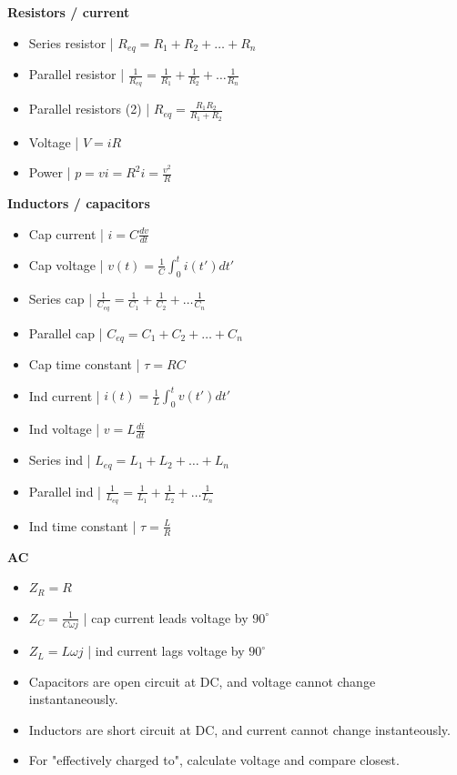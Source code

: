 \documentclass{article}
\begin{document}
\textbf{Resistors / current}
\begin{itemize}
    \item Series resistor | $R_{eq} = R_1 + R_2 + \dots + R_n$
    \item Parallel resistor | $\frac{1}{R_{eq}} = \frac{1}{R_1} + \frac{1}{R_2} + \dots \frac{1}{R_n}$
    \item Parallel resistors (2) | $R_{eq} = \frac{R_1R_2}{R_1 + R_2}$
    \item Voltage | $V = iR$
    \item Power | $p = vi = R^2i = \frac{v^2}{R}$
\end{itemize}
\textbf{Inductors / capacitors}
\begin{itemize}
    \item Cap current | $i = C \frac{dv}{dt}$ 
    \item Cap voltage | $v(t) = \frac{1}{C}\int_0^t i(t')dt'$
    \item Series cap | $\frac{1}{C_{eq}} = \frac{1}{C_1} + \frac{1}{C_2} + \dots \frac{1}{C_n}$
    \item Parallel cap | $C_{eq} = C_1 + C_2 + \dots + C_n$
    \item Cap time constant | $\tau = RC$
    \item Ind current | $i(t) = \frac{1}{L}\int_0^t v(t')dt'$
    \item Ind voltage | $v = L \frac{di}{dt}$
    \item Series ind | $L_{eq} = L_1 + L_2 + \dots + L_n$
    \item Parallel ind | $\frac{1}{L_{eq}} = \frac{1}{L_1} + \frac{1}{L_2} + \dots \frac{1}{L_n}$
    \item Ind time constant | $\tau = \frac{L}{R}$
\end{itemize}
\textbf{AC}
\begin{itemize}
    \item $Z_R = R$
    \item $Z_C = \frac{1}{C \omega j}$ | cap current leads voltage by $90^{\circ}$
    \item $Z_L = L \omega j$ | ind current lags voltage by $90^{\circ}$
    \item Capacitors are open circuit at DC, and voltage cannot change instantaneously.
    \item Inductors are short circuit at DC, and current cannot change instanteously.
    \item For "effectively charged to", calculate voltage and compare closest.
\end{itemize}
\end{document}
